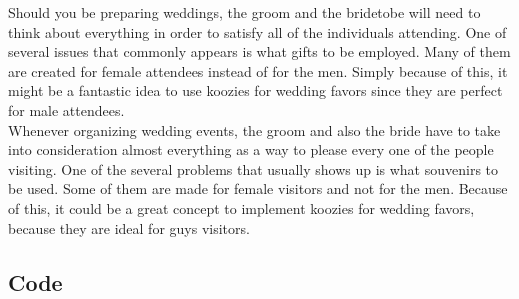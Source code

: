 \documentclass[11pt,letterpaper,oneside, titlepage]{scrartcl}
\begin{document}
Should you be preparing weddings, the groom and the bridetobe will need to think about everything in order to satisfy all of the individuals attending. One of several issues that commonly appears is what gifts to be employed. Many of them are created for female attendees instead of for the men. Simply because of this, it might be a fantastic idea to use koozies for wedding favors since they are perfect for male attendees.
\\

Whenever organizing wedding events, the groom and also the bride have to take into consideration almost everything as a way to please every one of the people visiting. One of the several problems that usually shows up is what souvenirs to be used. Some of them are made for female visitors and not for the men. Because of this, it could be a great concept to implement koozies for wedding favors, because they are ideal for guys visitors.




\clearpage

\subsection{Code}

\begin{lstlisting}

\end{lstlisting}
\end{document}
